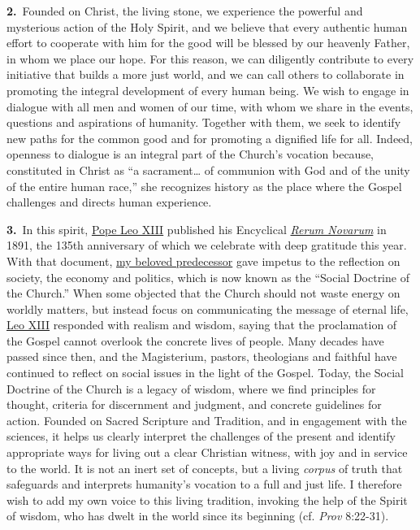 \documentclass{article}
\begin{document}
\textbf{2.}\ Founded on Christ, the living stone, we experience the powerful and mysterious action of the Holy Spirit, and we believe that every authentic human effort to cooperate with him for the good will be blessed by our heavenly Father, in whom we place our hope. For this reason, we can diligently contribute to every initiative that builds a more just world, and we can call others to collaborate in promoting the integral development of every human being. We wish to engage in dialogue with all men and women of our time, with whom we share in the events, questions and aspirations of humanity.\cite{n2} Together with them, we seek to identify new paths for the common good and for promoting a dignified life for all. Indeed, openness to dialogue is an integral part of the Church's vocation because, constituted in Christ as ``a sacrament\dots{} of communion with God and of the unity of the entire human race,''\cite{n3} she recognizes history as the place where the Gospel challenges and directs human experience.

\textbf{3.}\ In this spirit, \href{https://www.vatican.va/content/leo-xiii/en.html}{Pope Leo XIII} published his Encyclical \href{https://www.vatican.va/content/leo-xiii/en/encyclicals/documents/hf_l-xiii_enc_15051891_rerum-novarum.html}{\emph{Rerum Novarum}} in 1891, the 135th anniversary of which we celebrate with deep gratitude this year. With that document, \href{https://www.vatican.va/content/francesco/en.html}{my beloved predecessor} gave impetus to the reflection on society, the economy and politics, which is now known as the ``Social Doctrine of the Church.'' When some objected that the Church should not waste energy on worldly matters, but instead focus on communicating the message of eternal life, \href{https://www.vatican.va/content/leo-xiii/en.html}{Leo XIII} responded with realism and wisdom, saying that the proclamation of the Gospel cannot overlook the concrete lives of people.\cite{n4} Many decades have passed since then, and the Magisterium, pastors, theologians and faithful have continued to reflect on social issues in the light of the Gospel. Today, the Social Doctrine of the Church is a legacy of wisdom, where we find principles for thought, criteria for discernment and judgment, and concrete guidelines for action. Founded on Sacred Scripture and Tradition, and in engagement with the sciences, it helps us clearly interpret the challenges of the present and identify appropriate ways for living out a clear Christian witness, with joy and in service to the world. It is not an inert set of concepts, but a living \emph{corpus} of truth that safeguards and interprets humanity's vocation to a full and just life. I therefore wish to add my own voice to this living tradition, invoking the help of the Spirit of wisdom, who has dwelt in the world since its beginning (cf. \emph{Prov} 8:22-31).
\end{document}
